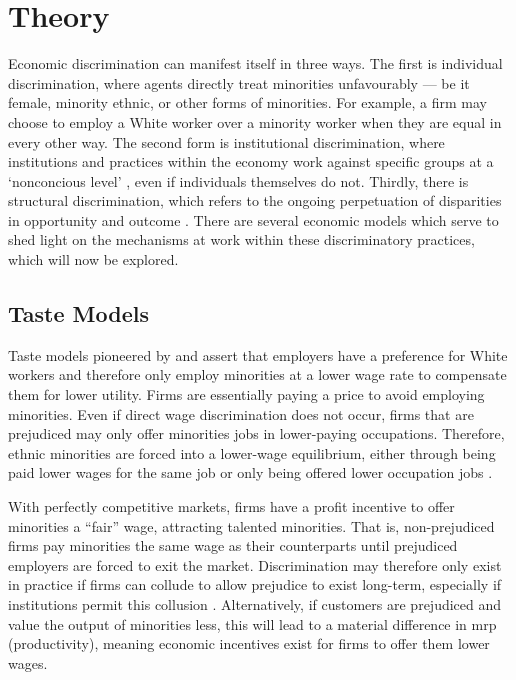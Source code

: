 \documentclass[class=article, crop=false]{standalone}
\begin{document}
\section{Theory}
\label{sec:Theory}
Economic discrimination can manifest itself in three ways. The first is individual discrimination, where agents directly treat minorities unfavourably --- be it female, minority ethnic, or other forms of minorities. For example, a firm may choose to employ a White worker over a minority worker when they are equal in every other way. The second form is institutional discrimination, where institutions and practices within the economy work against specific groups at a \enquote*{nonconcious level} \cite[p.~1814]{Ian}, even if individuals themselves do not. Thirdly, there is structural discrimination, which refers to the ongoing perpetuation of disparities in opportunity and outcome \citep{Lawrence}. There are several economic models which serve to shed light on the mechanisms at work within these discriminatory practices, which will now be explored.

\subsection{Taste Models}
\label{sec:Human Capital Models}
Taste models pioneered by \citet{Becker} and \citet{Arrow} assert that employers have a preference for White workers and therefore only employ minorities at a lower wage rate to compensate them for lower utility. Firms are essentially paying a price to avoid employing minorities. Even if direct wage discrimination does not occur, firms that are prejudiced may only offer minorities jobs in lower-paying occupations. Therefore, ethnic minorities are forced into a lower-wage equilibrium, either through being paid lower wages for the same job or only being offered lower occupation jobs \citep{Coate}.

With perfectly competitive markets, firms have a profit incentive to offer minorities a \enquote{fair} wage, attracting talented minorities. That is, non-prejudiced firms pay minorities the same wage as their counterparts until prejudiced employers are forced to exit the market. Discrimination may therefore only exist in practice if firms can collude to allow prejudice to exist long-term, especially if institutions permit this collusion \citep{LundbergB}. Alternatively, if customers are prejudiced and value the output of minorities less, this will lead to a material difference in \acrshort{mrp} (productivity), meaning economic incentives exist for firms to offer them lower wages.
\end{document}
